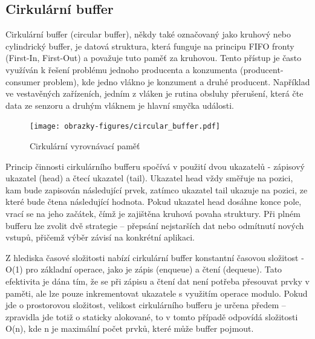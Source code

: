 \subsection{Cirkulární buffer}
\label{cirkularni_buffer}
Cirkulární buffer (circular buffer), někdy také označovaný jako kruhový nebo cylindrický buffer, je datová struktura, která funguje na principu FIFO fronty (First-In, First-Out) a považuje tuto paměť za kruhovou. Tento přístup je často využíván k řešení problému jednoho producenta a konzumenta (producent-consumer problem), kde jedno vlákno je konzument a druhé producent. Například ve vestavěných zařízeních, jedním z vláken je rutina obsluhy přerušení, která čte data ze senzoru a druhým vláknem je hlavní smyčka události. \cite{embedjournal_ring_buffer}


\begin{figure}[h]
    \centering
    \texttt{[image: obrazky-figures/circular\_buffer.pdf]}
    
    \caption{Cirkulární vyrovnávací paměť}
    \label{fig:circular-buffer}
\end{figure}

Princip činnosti cirkulárního bufferu spočívá v použití dvou ukazatelů - zápisový ukazatel (head) a čtecí ukazatel (tail). Ukazatel head vždy směřuje na pozici, kam bude zapisován následující prvek, zatímco ukazatel tail ukazuje na pozici, ze které bude čtena následující hodnota. Pokud ukazatel head dosáhne konce pole, vrací se na jeho začátek, čímž je zajištěna kruhová povaha struktury. Při plném bufferu lze zvolit dvě strategie – přepsání nejstarších dat nebo odmítnutí nových vstupů, přičemž výběr závisí na konkrétní aplikaci. \cite{embedjournal_ring_buffer, medium_ring_buffer}

Z hlediska časové složitosti nabízí cirkulární buffer konstantní časovou složitost - O(1) pro základní operace, jako je zápis (enqueue) a  čtení (dequeue). Tato efektivita je dána tím, že se při zápisu a čtení dat není potřeba přesouvat prvky v paměti, ale lze pouze inkrementovat ukazatele s využitím operace modulo. Pokud jde o prostorovou složitost, velikost cirkulárního bufferu je určena předem – zpravidla jde totiž o staticky alokované, to v tomto případě odpovídá složitosti O(n), kde n je maximální počet prvků, které může buffer pojmout. \cite{petrungaro_ring_buffer_complexity}

